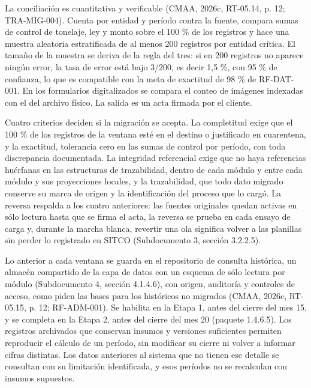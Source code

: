 \documentclass[subdoc]{../../comun/overfore}
\begin{document}
La conciliación es cuantitativa y verificable (CMAA, 2026c, RT-05.14, p. 12; TRA-MIG-004). Cuenta por entidad y período contra la fuente, compara sumas de control de tonelaje, ley y monto sobre el 100 \% de los registros y hace una muestra aleatoria estratificada de al menos 200 registros por entidad crítica. El tamaño de la muestra se deriva de la regla del tres: si en 200 registros no aparece ningún error, la tasa de error está bajo 3/200, es decir 1,5 \%, con 95 \% de confianza, lo que es compatible con la meta de exactitud de 98 \% de RF-DAT-001. En los formularios digitalizados se compara el conteo de imágenes indexadas con el del archivo físico. La salida es un acta firmada por el cliente.

Cuatro criterios deciden si la migración se acepta. La completitud exige que el 100 \% de los registros de la ventana esté en el destino o justificado en cuarentena, y la exactitud, tolerancia cero en las sumas de control por período, con toda discrepancia documentada. La integridad referencial exige que no haya referencias huérfanas en las estructuras de trazabilidad, dentro de cada módulo y entre cada módulo y sus proyecciones locales, y la trazabilidad, que todo dato migrado conserve su marca de origen y la identificación del proceso que lo cargó. La reversa respalda a los cuatro anteriores: las fuentes originales quedan activas en sólo lectura hasta que se firma el acta, la reversa se prueba en cada ensayo de carga y, durante la marcha blanca, revertir una ola significa volver a las planillas sin perder lo registrado en SITCO (Subdocumento 3, sección 3.2.2.5).

Lo anterior a cada ventana se guarda en el repositorio de consulta histórica, un almacén compartido de la capa de datos con un esquema de sólo lectura por módulo (Subdocumento 4, sección 4.1.4.6), con origen, auditoría y controles de acceso, como piden las bases para los históricos no migrados (CMAA, 2026c, RT-05.15, p. 12; RF-ADM-001). Se habilita en la Etapa 1, antes del cierre del mes 15, y se completa en la Etapa 2, antes del cierre del mes 20 (paquete 1.4.6.5). Los registros archivados que conservan insumos y versiones suficientes permiten reproducir el cálculo de un período, sin modificar su cierre ni volver a informar cifras distintas. Los datos anteriores al sistema que no tienen ese detalle se consultan con su limitación identificada, y esos períodos no se recalculan con insumos supuestos.
\end{document}
